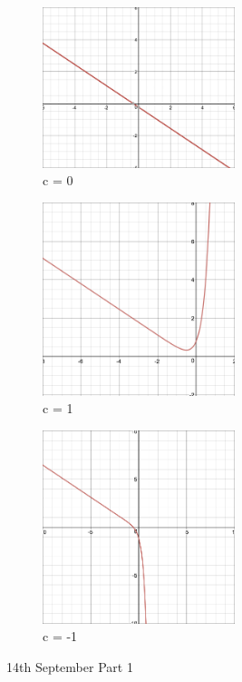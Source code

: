 \documentclass[11pt]{article}
\theoremstyle{definition}
\begin{document}
\begin{figure}[h!]
    \begin{center}
        \includegraphics[width=0.5\textwidth]{c0.png}
        \caption{c = 0}
    \end{center}
\end{figure}
\begin{figure}[h!]
    \begin{center}
        \includegraphics[width=0.5\textwidth]{c1.png}
        \caption{c = 1}
    \end{center}
\end{figure}

\begin{figure}[h!]
    \begin{center}
        \includegraphics[width=0.5\textwidth]{c-1.png}
        \caption{c = -1}
    \end{center}
\end{figure}
\vspace{5000mm}
\clearpage
\newpage
\begin{center}
    {\LARGE 14th September Part 1}\\
\end{center}
\setcounter{subsection}{1}
\end{document}
